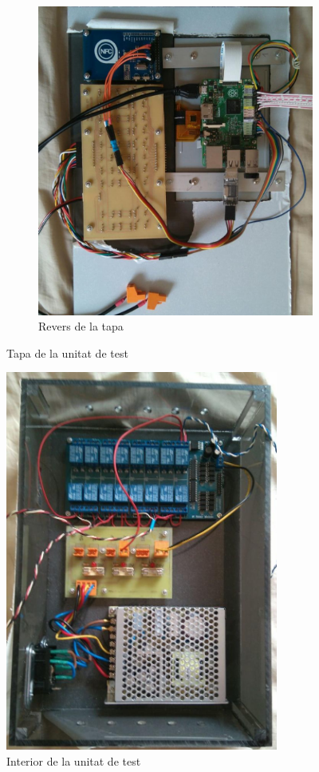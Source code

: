 \begin{figure}[H]
	\hspace{0.5cm}
	\begin{subfigure}[b]{0.45\textwidth}
		\includegraphics[width=\textwidth]{images/demonstrator_back}
		\caption{Revers de la tapa}
		\label{fig:admin2}
	\end{subfigure}
	\caption{Tapa de la unitat de test}
	\label{fig:intro-example}
\end{figure}

\begin{figure}[H]
\center
\includegraphics[width=0.8\textwidth]{images/demonstrator_bottom}
\caption{Interior de la unitat de test}
\label{fig:demonstrator_diagram}
\end{figure}
